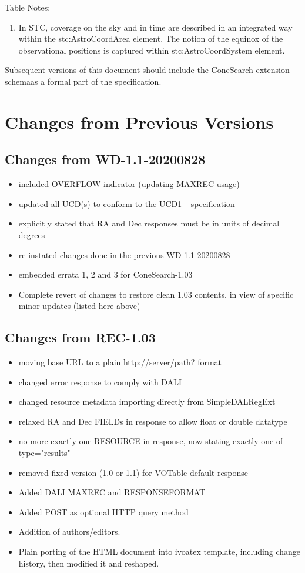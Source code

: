 \documentclass[11pt,a4paper]{ivoa}
\begin{document}
Table Notes:
\begin{enumerate}
	\item In STC, coverage on the sky and in
		time are described in an integrated way within the stc:AstroCoordArea
		element. The notion of the equinox of the observational positions is
		captured within stc:AstroCoordSystem element.
\end{enumerate} 

Subsequent versions of this document should include the ConeSearch extension 
schemaas a formal part of the specification.

\section{Changes from Previous Versions}

\subsection*{Changes from WD-1.1-20200828}
\begin{itemize}
	\item included OVERFLOW indicator (updating MAXREC usage)
	\item updated all UCD(s) to conform to the UCD1+ specification
	\item explicitly stated that RA and Dec responses must be
		in units of decimal degrees
	\item re-instated changes done in the previous WD-1.1-20200828
	\item embedded errata 1, 2 and 3 for ConeSearch-1.03
	\item Complete revert of changes to restore clean 1.03 contents,
		in view of specific minor updates (listed here above)
\end{itemize}

\subsection*{Changes from REC-1.03}
\label{appendix:first11changes}
\begin{itemize}
	\item moving base URL to a plain http://server/path? format
	\item changed error response to comply with DALI
	\item changed resource metadata importing directly from SimpleDALRegExt
	\item relaxed RA and Dec FIELDs in response to allow float or double datatype
	\item no more exactly one RESOURCE in response, now stating exactly one of
		type="results"
	\item removed fixed version (1.0 or 1.1) for VOTable default response
	\item Added DALI MAXREC and RESPONSEFORMAT
	\item Added POST as optional HTTP query method
	\item Addition of authors/editors.
	\item Plain porting of the HTML document into ivoatex template,
		including change history, then modified it and reshaped.
\end{itemize}
\end{document}
